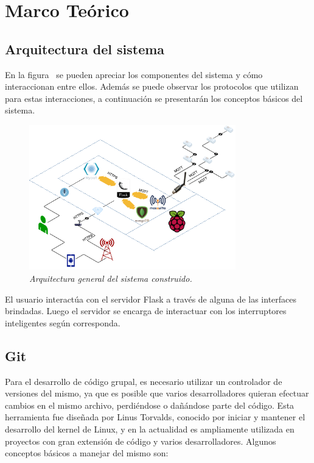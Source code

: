 \chapter{Marco Teórico}

\section{Arquitectura del sistema}

En la figura~ se pueden apreciar los componentes del sistema y cómo interaccionan entre ellos. Además se puede observar los protocolos que utilizan para estas interacciones, a continuación se presentarán los conceptos básicos del sistema.

\begin{figure}[h!]
  \centering
  \includegraphics[width=0.8\textwidth, keepaspectratio]{images/arquitectura-intro}
  \caption{\textit{Arquitectura general del sistema construido.}}
  \label{fig:dude-arq}
\end{figure}

El usuario interactúa con el servidor Flask a través de alguna de las interfaces brindadas. Luego el servidor se encarga de interactuar con los interruptores inteligentes según corresponda.

\section{Git}
Para el desarrollo de código grupal, es necesario utilizar un controlador de versiones del mismo, ya que es posible que varios desarrolladores quieran efectuar cambios en el mismo archivo, perdiéndose o dañándose parte del código.
Esta herramienta fue diseñada por Linus Torvalds, conocido por iniciar y mantener el desarrollo del kernel de Linux, y en la actualidad es ampliamente utilizada en proyectos con gran extensión de código y varios desarrolladores.
Algunos conceptos básicos a manejar del mismo son:

